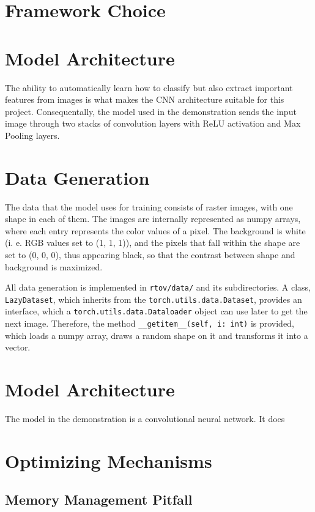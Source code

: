 \documentclass[12pt, a4paper, titlepage]{report}
\begin{document}
\section{Framework Choice}
\section{Model Architecture}

The ability to automatically learn how to classify but also extract important features from images is what makes the CNN architecture suitable for this project. Consequentally, the model used in the demonstration sends the input image through two stacks of convolution layers with ReLU activation and Max Pooling layers.


\section{Data Generation}

The data that the model uses for training consists of raster images, with one shape in each of them. The images are internally represented as numpy arrays, where each entry represents the color values of a pixel. The background is white (i. e. RGB values set to (1, 1, 1)), and the pixels that fall within the shape are set to (0, 0, 0), thus appearing black, so that the contrast between shape and background is maximized.

All data generation is implemented in \lstinline{rtov/data/} and its subdirectories. A class, \lstinline{LazyDataset}, which inherits from the \lstinline{torch.utils.data.Dataset}, provides an interface, which a \lstinline{torch.utils.data.Dataloader} object can use later to get the next image. Therefore, the method \lstinline{__getitem__(self, i: int)} is provided, which loads a numpy array, draws a random shape on it and transforms it into a vector.

\section{Model Architecture}

The model in the demonstration is a convolutional neural network. It does

\section{Optimizing Mechanisms}

\subsection{Memory Management Pitfall}
\end{document}
